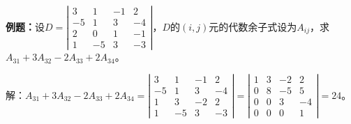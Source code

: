\documentclass[UTF8, 12pt]{ctexart}
\begin{document}
\textbf{例题：}设$D=\left|\begin{array}{cccc} 
    3 & 1 & -1 & 2 \\
    -5 & 1 & 3 & -4 \\
    2 & 0 & 1 & -1 \\
    1 & -5 & 3 &-3
\end{array}\right|$，$D$的$(i,j)$元的代数余子式设为$A_{ij}$，求$A_{31}+3A_{32}-2A_{33}+2A_{34}$。

解：$A_{31}+3A_{32}-2A_{33}+2A_{34}=\left|\begin{array}{cccc} 
    3 & 1 & -1 & 2 \\
    -5 & 1 & 3 & -4 \\
    1 & 3 & -2 & 2 \\
    1 & -5 & 3 &-3
\end{array}\right|
=\left|\begin{array}{cccc} 
    1 & 3 & -2 & 2 \\
    0 & 8 & -5 & 5 \\
    0 & 0 & 3 & -4 \\
    0 & 0 & 0 & 1
\end{array}\right|=24$。
\end{document}
